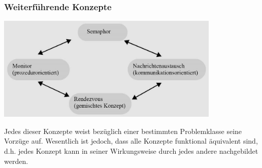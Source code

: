 \subsubsection{Weiterführende Konzepte}
\begin{minipage}{0.5\textwidth}
    \includegraphics[width=0.8\textwidth]{images/Betriebssysteme/KonzepteInterprozesskommunikation.png}
\end{minipage}
\hfill
\begin{minipage}{0.45\textwidth}
    Jedes dieser Konzepte weist bezüglich einer bestimmten Problemklasse seine Vorzüge auf. Wesentlich ist jedoch, dass alle Konzepte funktional äquivalent sind, d.h. jedes Konzept kann in seiner Wirkungsweise durch jedes andere nachgebildet werden.
\end{minipage}

